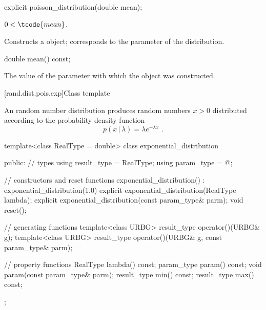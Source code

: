 %
\begin{itemdecl}
explicit poisson_distribution(double mean);
\end{itemdecl}

\begin{itemdescr}
\pnum
\requires $0 < \tcode{mean}$.

\pnum
\effects Constructs a  object;
 corresponds to the parameter of the distribution.
\end{itemdescr}

%
\begin{itemdecl}
double mean() const;
\end{itemdecl}

\begin{itemdescr}
\pnum\returns The value of the  parameter
 with which the object was constructed.
\end{itemdescr}


[rand.dist.pois.exp]{Class template }%
%
%

\pnum
An  random number distribution
produces random numbers $x > 0$
distributed according to
the probability density function%
%
%
\[ p(x\,|\,\lambda) = \lambda e^{-\lambda x} \text{ .} \]

%
\begin{codeblock}
template<class RealType = double>
  class exponential_distribution {
  public:
    // types
    using result_type = RealType;
    using param_type  = @\unspec@;

    // constructors and reset functions
    exponential_distribution() : exponential_distribution(1.0) {}
    explicit exponential_distribution(RealType lambda);
    explicit exponential_distribution(const param_type& parm);
    void reset();

    // generating functions
    template<class URBG>
      result_type operator()(URBG& g);
    template<class URBG>
      result_type operator()(URBG& g, const param_type& parm);

    // property functions
    RealType lambda() const;
    param_type param() const;
    void param(const param_type& parm);
    result_type min() const;
    result_type max() const;
  };
\end{codeblock}


